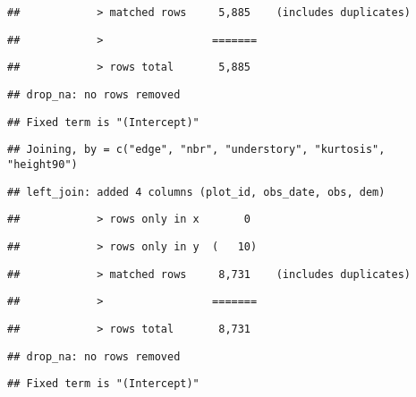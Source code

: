 \documentclass[
]{article}
\begin{document}
\begin{verbatim}
##            > matched rows     5,885    (includes duplicates)
\end{verbatim}

\begin{verbatim}
##            >                 =======
\end{verbatim}

\begin{verbatim}
##            > rows total       5,885
\end{verbatim}

\begin{verbatim}
## drop_na: no rows removed
\end{verbatim}

\begin{verbatim}
## Fixed term is "(Intercept)"
\end{verbatim}

\begin{verbatim}
## Joining, by = c("edge", "nbr", "understory", "kurtosis", "height90")
\end{verbatim}

\begin{verbatim}
## left_join: added 4 columns (plot_id, obs_date, obs, dem)
\end{verbatim}

\begin{verbatim}
##            > rows only in x       0
\end{verbatim}

\begin{verbatim}
##            > rows only in y  (   10)
\end{verbatim}

\begin{verbatim}
##            > matched rows     8,731    (includes duplicates)
\end{verbatim}

\begin{verbatim}
##            >                 =======
\end{verbatim}

\begin{verbatim}
##            > rows total       8,731
\end{verbatim}

\begin{verbatim}
## drop_na: no rows removed
\end{verbatim}

\begin{verbatim}
## Fixed term is "(Intercept)"
\end{verbatim}
\end{document}
